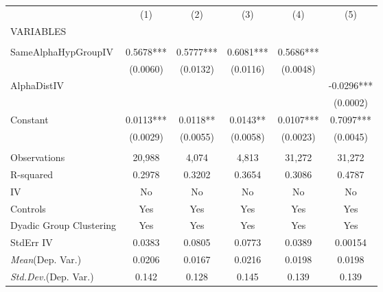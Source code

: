 \documentclass[]{article}
\begin{document}
\begin{tabular}{lccccc} \hline
 & (1) & (2) & (3) & (4) & (5) \\
VARIABLES &  &  &  &  &  \\ \hline
 &  &  &  &  &  \\
SameAlphaHypGroupIV & 0.5678*** & 0.5777*** & 0.6081*** & 0.5686*** &  \\
 & (0.0060) & (0.0132) & (0.0116) & (0.0048) &  \\
AlphaDistIV &  &  &  &  & -0.0296*** \\
 &  &  &  &  & (0.0002) \\
Constant & 0.0113*** & 0.0118** & 0.0143** & 0.0107*** & 0.7097*** \\
 & (0.0029) & (0.0055) & (0.0058) & (0.0023) & (0.0045) \\
 &  &  &  &  &  \\
Observations & 20,988 & 4,074 & 4,813 & 31,272 & 31,272 \\
R-squared & 0.2978 & 0.3202 & 0.3654 & 0.3086 & 0.4787 \\
IV & No & No & No & No & No \\
Controls & Yes & Yes & Yes & Yes & Yes \\
Dyadic Group Clustering & Yes & Yes & Yes & Yes & Yes \\
StdErr IV & 0.0383 & 0.0805 & 0.0773 & 0.0389 & 0.00154 \\
\textit{Mean}(Dep. Var.) & 0.0206 & 0.0167 & 0.0216 & 0.0198 & 0.0198 \\
 \textit{Std.Dev.}(Dep. Var.) & 0.142 & 0.128 & 0.145 & 0.139 & 0.139 \\ \hline
\end{tabular}
\end{document}
